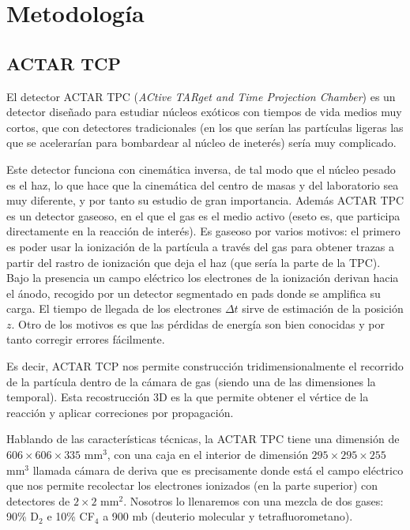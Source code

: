 \section{Metodología}


\subsection{ACTAR TCP}

El detector ACTAR TPC (\textit{ACtive TARget and Time Projection Chamber}) es un detector diseñado para estudiar núcleos exóticos con tiempos de vida medios muy cortos, que con detectores tradicionales (en los que serían las partículas ligeras las que se acelerarían para bombardear al núcleo de ineterés) sería muy complicado.

Este detector funciona con cinemática inversa, de tal modo que el núcleo pesado es el haz, lo que hace que la cinemática del centro de masas y del laboratorio sea muy diferente, y por tanto su estudio de gran importancia. Además ACTAR TPC es un detector gaseoso, en el que el gas es el medio activo (eseto es, que participa directamente en la reacción de interés). Es gaseoso por varios motivos: el primero es poder usar la ionización de la partícula a través del gas para obtener trazas a partir del rastro de ionización que deja el haz (que sería la parte de la TPC). Bajo la presencia un campo eléctrico los electrones de la ionización derivan hacia el ánodo, recogido por un detector segmentado en pads donde se ampliﬁca su carga. El tiempo de llegada de los electrones $\Delta t$ sirve de estimación de la posición $z$. Otro de los motivos es que las pérdidas de energía son bien conocidas y por tanto corregir errores fácilmente.

Es decir, ACTAR TCP nos permite construcción tridimensionalmente el recorrido de la partícula dentro de la cámara de gas (siendo una de las dimensiones la temporal). Esta recostrucción 3D es la que permite obtener el vértice de la reacción y aplicar correciones por propagación.

Hablando de las características técnicas, la ACTAR TPC tiene una dimensión de $606 \times 606 \times 335 $ mm$^3$, con una caja en el interior de dimensión $295 \times 295 \times 255 $ mm$^3$ llamada cámara de deriva que es precisamente donde está el campo eléctrico  que nos permite recolectar los electrones ionizados (en la parte superior) con detectores de $2 \times 2$ mm$^2$. Nosotros lo llenaremos con una mezcla de dos gases: 90\% D$_2$ e 10\% CF$_4$ a 900 mb (deuterio molecular y tetrafluorometano).

